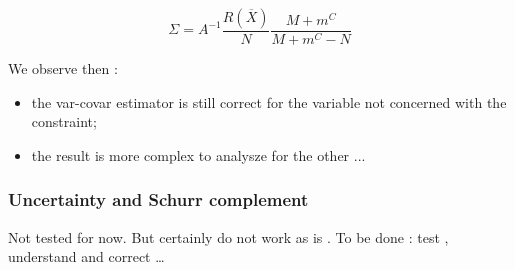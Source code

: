 \begin{equation}
	\Sigma = A^{-1}  \frac{R(\overline X)}{N}  \frac{M+m^C}{M+m^C -N}  \label{LstSq:Cstr:EstVarCov}
\end{equation}

We observe then :

\begin{itemize}
   \item  the var-covar estimator is still correct  for the variable not concerned with the constraint;
   \item  the result is more complex to analysze for the other ... 
\end{itemize}


\subsubsection{Uncertainty and Schurr complement}

Not tested for now. But certainly do not work as is . To be done : test , understand and correct \dots







